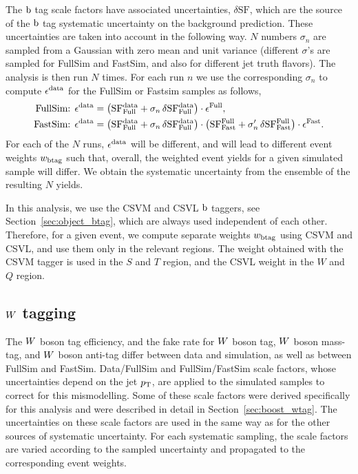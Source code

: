The $\mathrm{b}$ tag scale factors have associated uncertainties, $\delta\mathrm{SF}$, which are the
source of the $\mathrm{b}$ tag systematic uncertainty on the background prediction. 
These uncertainties are taken into account in the following way.
$N$ numbers $\sigma_n$ are sampled from a Gaussian with zero mean and unit variance
(different $\sigma$'s are sampled for FullSim and FastSim, and also for different jet truth
flavors). The analysis is then run $N$ times. For each run $n$ we use the corresponding $\sigma_n$
to compute $\epsilon^{\rm data}$ for the FullSim or Fastsim samples as follows, 
\begin{align}
\textrm{FullSim: } \epsilon^{\rm data} &= \left(\mathrm{SF^{data}_{Full}} + \sigma_n \, \delta
\mathrm{SF^{data}_{Full}} \right) \cdot \epsilon^{\rm Full} , \\
\textrm{FastSim: } \epsilon^{\rm data} &= \left(\mathrm{SF^{data}_{Full}} + \sigma_n \, \delta
\mathrm{SF^{data}_{Full}}\right) \cdot \left(\mathrm{SF^{Full}_{Fast}} + \sigma_n' \, \delta
\mathrm{SF^{Full}_{Fast}} \right) \cdot \epsilon^{\rm Fast}.
\end{align}
For each of the $N$ runs, $\epsilon^{\rm data}$ will be different, and will lead to different
event weights $w_{\rm btag}$ such that, overall, the weighted event yields for a given simulated
sample will differ. 
We obtain the systematic uncertainty from the ensemble of the resulting $N$ yields.

In this analysis, we use the CSVM and CSVL $\mathrm{b}$ taggers, see Section~\ref{sec:object_btag}, which
are always used independent of each other. Therefore, for a given event, we compute separate weights
$w_{\rm btag}$ using CSVM and CSVL, and use them only in the relevant regions. The weight obtained
with the CSVM tagger is used in the $S$ and $T$ region, and the CSVL weight in the $W$ and $Q$
region.

\subsection{\texorpdfstring{$W$}{W} tagging} 

The $W$ boson tag efficiency, and the fake rate for $W$ boson tag, $W$ boson mass-tag, and $W$
boson anti-tag differ between data and simulation, as well as between FullSim and FastSim. 
Data/FullSim and FullSim/FastSim scale factors, whose uncertainties depend on the jet $p_{\mathrm{T}}$,
are applied to the simulated samples to correct for this mismodelling.
Some of these scale factors were derived specifically for this analysis and were described in detail
in Section~\ref{sec:boost_wtag}.
The uncertainties on these scale factors are used in the same way as for the other sources of
systematic uncertainty. For each systematic sampling, the scale factors are varied according to the
sampled uncertainty and propagated to the corresponding event weights.

